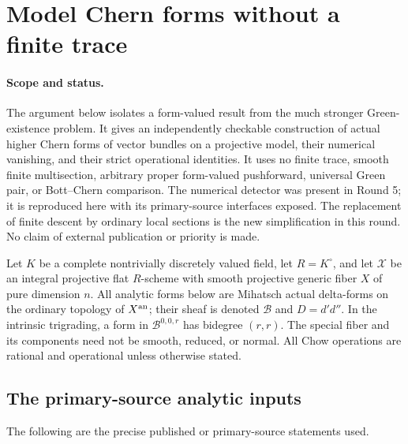 \section{Model Chern forms without a finite trace}
\label{r10c:section}

\paragraph{Scope and status.}
The argument below isolates a form-valued result from the much stronger
Green-existence problem.  It gives an independently checkable construction
of actual higher Chern forms of vector bundles on a projective model,
their numerical vanishing, and their strict operational identities.
It uses no finite trace, smooth finite multisection, arbitrary proper
form-valued pushforward, universal Green pair, or Bott--Chern comparison.
The numerical detector was present in Round 5; it is reproduced here with
its primary-source interfaces exposed.  The replacement of finite descent
by ordinary local sections is the new simplification in this round.
No claim of external publication or priority is made.

Let $K$ be a complete nontrivially discretely valued field, let
$R=K^\circ$, and let $\mathcal X$ be an integral projective flat
$R$-scheme with smooth projective generic fiber $X$ of pure dimension $n$.
All analytic forms below are Mihatsch actual delta-forms on the ordinary
topology of $X^{\rm an}$; their sheaf is denoted $\mathcal B$ and
$D=d'd''$.  In the intrinsic trigrading, a form in
$\mathcal B^{0,0,r}$ has bidegree $(r,r)$.
The special fiber and its components need not be smooth, reduced, or
normal.  All Chow operations are rational and operational unless
otherwise stated.

\subsection{The primary-source analytic inputs}

The following are the precise published or primary-source statements used.

